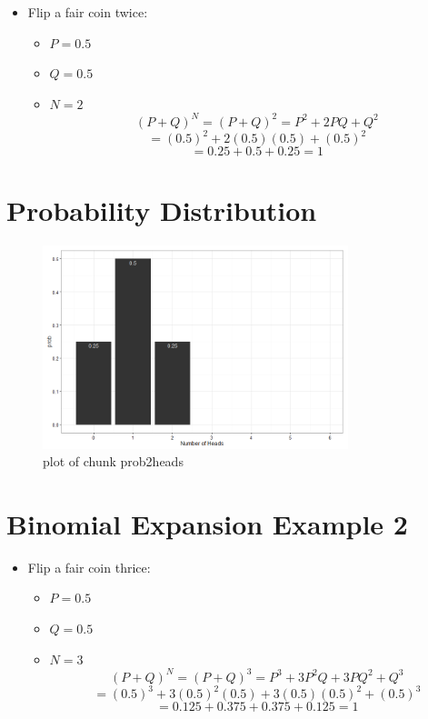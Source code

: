 \documentclass[12pt]{article}
\begin{document}
\begin{itemize}
\itemsep1pt\parskip0pt
\item
  Flip a fair coin twice:

  \begin{itemize}
  \itemsep1pt\parskip0pt
  \item
    \(P = 0.5\)
  \item
    \(Q = 0.5\)
  \item
    \(N = 2\) \[(P + Q)^N = (P + Q)^2 = P^2 + 2PQ + Q^2 \]
    \[ = (0.5)^2 + 2(0.5)(0.5) + (0.5)^2 \] \[ = 0.25 + 0.5 + 0.25 = 1\]
  \end{itemize}
\end{itemize}

\section{Probability Distribution}\label{probability-distribution}

\begin{figure}[H]
\centering
\includegraphics[width=3.5in]{figure/prob2heads-1.png}
\caption{plot of chunk prob2heads}
\end{figure}

\section{Binomial Expansion Example
2}\label{binomial-expansion-example-2}

\begin{itemize}
\itemsep1pt\parskip0pt
\item
  Flip a fair coin thrice:

  \begin{itemize}
  \itemsep1pt\parskip0pt
  \item
    \(P = 0.5\)
  \item
    \(Q = 0.5\)
  \item
    \(N = 3\) \[(P + Q)^N = (P + Q)^3 = P^3 + 3P^2Q + 3PQ^2 + Q^3 \]
    \[ = (0.5)^3 + 3(0.5)^2(0.5) + 3(0.5)(0.5)^2 + (0.5)^3 \]
    \[ = 0.125 + 0.375 + 0.375 + 0.125 = 1\]
  \end{itemize}
\end{itemize}
\end{document}
